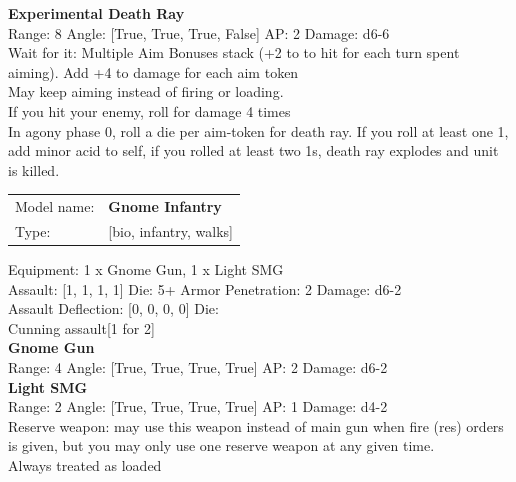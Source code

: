 {\bf Experimental Death Ray } \\



Range: 8  Angle: [True, True, True, False] AP: 2 Damage: d6-6 \\
Wait for it: Multiple Aim Bonuses stack (+2 to to hit for each turn spent aiming). Add +4 to damage for each aim token\\ 
May keep aiming instead of firing or loading.\\ 
If you hit your enemy, roll for damage 4 times\\ 
In agony phase 0, roll a die per aim-token for death ray. If you roll at least one 1, add minor acid to self, if you rolled at least two 1s, death ray explodes and unit is killed.\\ 




 



\begin{tabular}{ll}
Model name: & {\bf Gnome Infantry } \\
Type: & [bio, infantry, walks] \\
\end{tabular}

Equipment: 1 x Gnome Gun, 1 x Light SMG \\

Assault: [1, 1, 1, 1] Die: 5+ Armor Penetration: 2 Damage: d6-2 \\
Assault Deflection: [0, 0, 0, 0] Die: \\
\indent Cunning assault[1 for 2]\\ 
 



{\bf Gnome Gun } \\



Range: 4  Angle: [True, True, True, True] AP: 2 Damage: d6-2 \\




{\bf Light SMG } \\



Range: 2  Angle: [True, True, True, True] AP: 1 Damage: d4-2 \\
Reserve weapon: may use this weapon instead of main gun when fire (res) orders is given, but you may only use one reserve weapon at any given time.\\ 
Always treated as loaded\\ 




